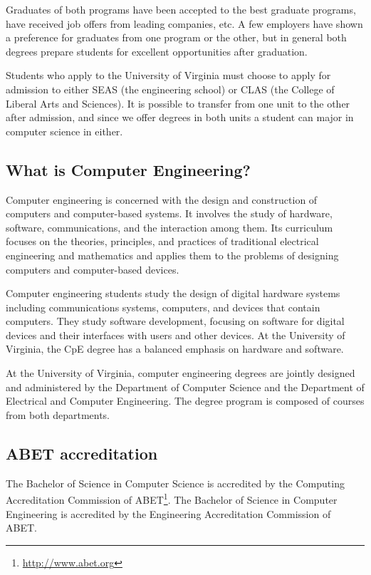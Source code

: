 \documentclass[10pt,letter]{book}
\newcommand{\myurlremember}[2]{\footnote{\scriptsize\url{#2}}\newcounter{#1}\setcounter{#1}{\value{footnote}}}
\newcommand{\myurlrecall}[1]{\footnotemark[\value{#1}]}
\begin{document}
Graduates of both programs have been accepted to the best graduate
programs, have received job offers from leading companies, etc. A few
employers have shown a preference for graduates from one program or
the other, but in general both degrees prepare students for excellent
opportunities after graduation.

Students who apply to the University of Virginia must choose to apply
for admission to either SEAS (the engineering school) or CLAS (the
College of Liberal Arts and Sciences). It is possible to transfer from
one unit to the other after admission, and since we offer degrees in
both units a student can major in computer science in either.

\subsection{What is Computer Engineering?}

Computer engineering is concerned with the design and construction of
computers and computer-based systems. It involves the study of
hardware, software, communications, and the interaction among
them. Its curriculum focuses on the theories, principles, and
practices of traditional electrical engineering and mathematics and
applies them to the problems of designing computers and computer-based
devices.

Computer engineering students study the design of digital hardware
systems including communications systems, computers, and devices that
contain computers. They study software development, focusing on
software for digital devices and their interfaces with users and other
devices. At the University of Virginia, the CpE degree has a balanced
emphasis on hardware and software.

At the University of Virginia, computer engineering degrees are
jointly designed and administered by the Department of Computer
Science and the Department of Electrical and Computer Engineering. The
degree program is composed of courses from both departments. 

\subsection{ABET accreditation}

The Bachelor of Science in Computer Science is accredited by the
Computing Accreditation Commission of
ABET\myurlremember{abet}{http://www.abet.org}.  The Bachelor of
Science in Computer Engineering is accredited by the Engineering
Accreditation Commission of ABET\myurlrecall{abet}.
\end{document}
